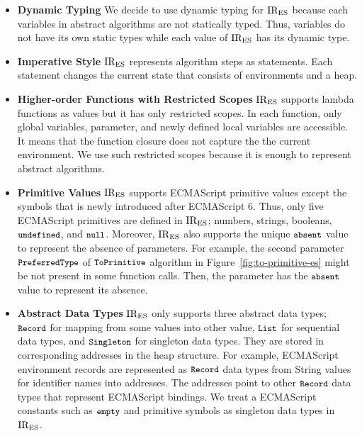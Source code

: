 \begin{itemize}
\item \textbf{Dynamic Typing} We decide to use dynamic typing for \( \text{IR}_\text{ES} \)
because each variables in abstract algorithms are not statically typed.
Thus, variables do not have its own static types while each value of \( \text{IR}_\text{ES} \)
has its dynamic type.

\item \textbf{Imperative Style} \( \text{IR}_\text{ES} \) represents algorithm steps
as statements. Each statement changes the current state
that consists of environments and a heap.

\item \textbf{Higher-order Functions with Restricted Scopes} \( \text{IR}_\text{ES} \) supports
lambda functions as values but it has only restricted scopes. In each function,
only global variables, parameter, and newly defined local variables are accessible.
It means that the function closure does not capture the the current environment.
We use such restricted scopes because it is enough to represent abstract algorithms.

\item \textbf{Primitive Values} \( \text{IR}_\text{ES} \) supports ECMAScript primitive values except
the symbols that is newly introduced after ECMAScript 6. Thus, only five ECMAScript primitives
are defined in \( \text{IR}_\text{ES} \); numbers, strings, booleans, \( \texttt{\small undefined} \), and \( \texttt{\small null} \).
Moreover, \( \text{IR}_\text{ES} \) also supports the unique \( \texttt{\small absent} \) value to represent
the absence of parameters. For example, the second parameter \( \texttt{\small PreferredType} \)
of \( \texttt{\small ToPrimitive} \) algorithm in Figure~\ref{fig:to-primitive-es} might be
not present in some function calls. Then, the parameter has the \( \texttt{\small absent} \) value
to represent its absence.

\item \textbf{Abstract Data Types} \( \text{IR}_\text{ES} \) only supports three abstract data types;
\( \texttt{\small Record} \) for mapping from some values into other value,
\( \texttt{\small List} \) for sequential data types,
and \( \texttt{\small Singleton} \) for singleton data types.
They are stored in corresponding addresses in the heap structure.
For example, ECMAScript environment records are represented as \( \texttt{\small Record} \) data types
from String values for identifier names into addresses.
The addresses point to other \( \texttt{\small Record} \) data types that represent ECMAScript bindings.
We treat a ECMAScript constants such as \( \texttt{\small empty} \) and primitive symbols as singleton
data types in \( \text{IR}_\text{ES} \).
\end{itemize}

